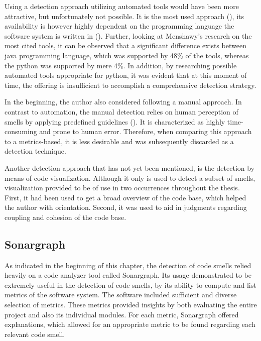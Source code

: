 Using a detection approach utilizing automated tools would have been more attractive, but unfortunately not possible.  It is the most used approach (\cite{menshawy2021}), its availability is however highly dependent on the programming language the software system is written in (\cite{menshawy2021}). Further, looking at Menshawy's research on the most cited tools, it can be observed that a significant difference exists between java programming language, which was supported  by 48\% of the tools, whereas the python was supported by mere 4\%. In addition, by researching possible automated tools appropriate for python, it was evident that at this moment of time, the offering is insufficient to accomplish a comprehensive detection strategy. 

In the beginning, the author also considered following a manual approach. In contrast to automation, the manual detection relies on human perception of smells by applying predefined guidelines (\cite{menshawy2021}). It is characterized as highly time-consuming and prone to human error. Therefore, when comparing this approach to a metrics-based, it is less desirable and was subsequently discarded as a detection technique.

Another detection approach that has not yet been mentioned, is the detection by means of code visualization. Although it only is used to detect a subset of smells, visualization provided to be of use in two occurrences throughout the thesis. First, it had been used to get a broad overview of the code base, which helped the author with orientation. Second, it was used to aid in judgments regarding coupling and cohesion of the code base. 

\subsection{Sonargraph}
As indicated in the beginning of this chapter, the detection of code smells relied heavily on a code analyzer tool called Sonargraph. Its usage demonstrated to be extremely useful in the detection of code smells, by its ability to compute and list metrics of the software system. The software included sufficient and diverse selection of metrics. These metrics provided insights by both evaluating the entire project and also its individual modules. For each metric, Sonargraph offered explanations, which allowed for an appropriate metric to be found regarding each relevant code smell.

